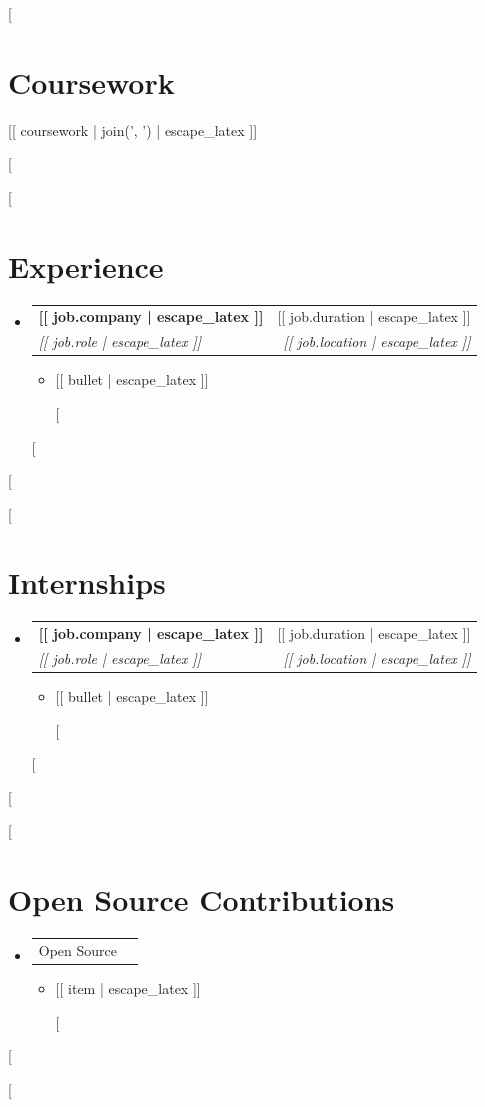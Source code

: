 \documentclass[letterpaper,11pt]{article}
\makeatletter
\newcommand{\resumeItem}[1]{
  \item\small{{#1 \vspace{-2pt}}}
}
\newcommand{\resumeSubheading}[4]{
  \vspace{-2pt}\item
  \begin{tabular*}{0.97\textwidth}[t]{l@{\extracolsep{\fill}}r}
    \textbf{#1} & #2 \\
    \textit{\small#3} & \textit{\small #4} \\
  \end{tabular*}\vspace{-7pt}
}
\newcommand{\resumeProjectHeading}[2]{
  \item
  \begin{tabular*}{0.97\textwidth}{l@{\extracolsep{\fill}}r}
    \small#1 & #2 \\
  \end{tabular*}\vspace{-7pt}
}
\newcommand{\resumeSubHeadingListStart}{\begin{itemize}[leftmargin=0.15in, label={}]}
\newcommand{\resumeSubHeadingListEnd}{\end{itemize}}
\newcommand{\resumeItemListStart}{\begin{itemize}}
\newcommand{\resumeItemListEnd}{\end{itemize}\vspace{-5pt}}
\makeatother
\begin{document}
[%
\section{Coursework}
 \begin{itemize}[leftmargin=0.15in, label={}]
    \small{\item{[[ coursework | join(', ') | escape_latex ]]}}
 \end{itemize}
[%

[%
\section{Experience}
  \resumeSubHeadingListStart
    [%
    \resumeSubheading
      {[[ job.company | escape_latex ]]}{[[ job.duration | escape_latex ]]}
      {[[ job.role | escape_latex ]]}{[[ job.location | escape_latex ]]}
      \resumeItemListStart
        [%
        \resumeItem{[[ bullet | escape_latex ]]}
        [%
      \resumeItemListEnd
    [%
  \resumeSubHeadingListEnd
[%

[%
\section{Internships}
  \resumeSubHeadingListStart
    [%
    \resumeSubheading
      {[[ job.company | escape_latex ]]}{[[ job.duration | escape_latex ]]}
      {[[ job.role | escape_latex ]]}{[[ job.location | escape_latex ]]}
      \resumeItemListStart
        [%
        \resumeItem{[[ bullet | escape_latex ]]}
        [%
      \resumeItemListEnd
    [%
  \resumeSubHeadingListEnd
[%

[%
\section{Open Source Contributions}
\resumeSubHeadingListStart
  \resumeProjectHeading
      {Open Source}{}
      \resumeItemListStart
        [%
        \resumeItem{[[ item | escape_latex ]]}
        [%
      \resumeItemListEnd
\resumeSubHeadingListEnd
[%

[%
\end{document}
